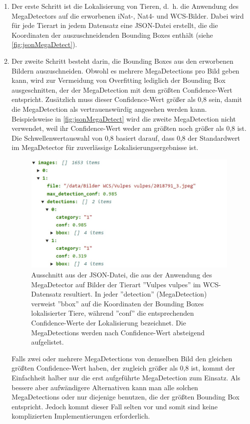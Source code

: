 \begin{enumerate}

	\item Der erste Schritt ist die Lokalisierung von Tieren, d.~h. die Anwendung des MegaDetectors auf die erworbenen iNat-, Nat4- und WCS-Bilder.	Dabei wird für jede Tierart in jedem Datensatz eine JSON-Datei erstellt, die die Koordinaten der auszuschneidenden Bounding Boxes enthält (siehe \autoref{fig:jsonMegaDetect}).
	
	\item Der zweite Schritt besteht darin, die Bounding Boxes aus den erworbenen Bildern auszuschneiden. Obwohl es mehrere MegaDetections pro Bild geben kann, wird zur Vermeidung von Overfitting lediglich der Bounding Box ausgeschnitten, der der MegaDetection mit dem größten Confidence-Wert entspricht. Zusätzlich muss dieser Confidence-Wert größer als 0,8 sein, damit die MegaDetection als vertrauenswürdig angesehen werden kann. Beispielsweise in \autoref{fig:jsonMegaDetect} wird die zweite MegaDetection nicht verwendet, weil ihr Confidence-Wert weder am größten noch größer als 0,8 ist. Die Schwellenwertauswahl von 0,8 basiert darauf, dass 0,8 der Standardwert im MegaDetector für zuverlässige Lokalisierungsergebnisse ist. 
	
	\begin{figure}[h]
		\centering
		\includegraphics[width=0.95\linewidth]{images/jsonMegaDetect}
		\caption{Ausschnitt aus der JSON-Datei, die aus der Anwendung des MegaDetector auf Bilder der Tierart ''Vulpes vulpes'' im WCS-Datensatz resultiert. In jeder ''detection'' (MegaDetection) verweist ''bbox'' auf die Koordinaten der Bounding Boxes lokalisierter Tiere, während ''conf'' die entsprechenden Confidence-Werte der Lokalisierung bezeichnet. Die MegaDetections werden nach Confidence-Wert absteigend aufgelistet.}
		\label{fig:jsonMegaDetect}
	\end{figure}
	
	Falls zwei oder mehrere MegaDetections von demselben Bild den gleichen größten Confidence-Wert haben, der zugleich größer als 0,8 ist, kommt der Einfachheit halber nur die erst aufgeführte MegaDetection zum Einsatz. Als bessere aber aufwändigere Alternativen kann man alle solchen MegaDetections oder nur diejenige benutzen, die der größten Bounding Box entspricht. Jedoch kommt dieser Fall selten vor und somit sind keine komplizierten Implementierungen erforderlich.
\end{enumerate}


